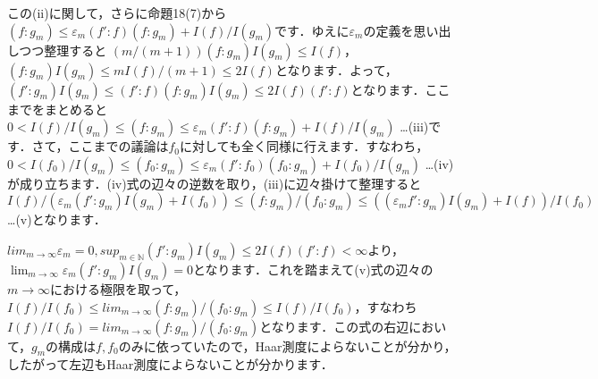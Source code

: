 この(ii)に関して，さらに命題18(7)から$\left( f \colon g_{m} \right) \le \varepsilon_{m} \left( f' \colon f \right) \left( f \colon g_{m} \right) + I(f)/I(g_{m})$です．ゆえに$\varepsilon_{m}$の定義を思い出しつつ整理すると $\left( m/(m+1) \right) \left( f \colon g_{m} \right)I(g_{m}) \le I(f)$，$\left( f \colon g_{m} \right)I(g_{m}) \le mI(f)/(m+1) \le 2I(f)$となります．よって，$\left( f' \colon g_{m} \right)I(g_{m}) \le 
\left( f' \colon f \right) \left( f \colon g_{m} \right) I(g_{m}) \le 2I(f)\left( f' \colon f \right)$となります．ここまでをまとめると$0<I(f)/I(g_{m}) \le \left( f \colon g_{m} \right) \le \varepsilon_{m} \left( f' \colon f \right) \left( f \colon g_{m} \right) + I(f)/I(g_{m})$ …(iii)です．さて，ここまでの議論は$f_0$に対しても全く同様に行えます．すなわち，$0<I(f_0)/I(g_{m}) \le \left( f_0 \colon g_{m} \right) \le \varepsilon_{m} \left( f' \colon f_0 \right) \left( f_0 \colon g_{m} \right) + I(f_0)/I(g_{m})$ …(iv)が成り立ちます．(iv)式の辺々の逆数を取り，(iii)に辺々掛けて整理すると$I(f)/ \left( \varepsilon_{m} \left( f' \colon g_{m} \right)I(g_{m}) + I(f_0) \right) \le \left( f \colon g_{m} \right) / \left( f_0 \colon g_{m} \right) \le \left( \left( \varepsilon_{m} f' \colon g_{m} \right)I(g_{m}) + I(f) \right) / I(f_0)$…(v)となります．

$lim_{m \to \infty}\varepsilon_{m} =0, sup_{m \in \mathbb{N}}\left( f' \colon g_{m} \right)I(g_{m}) \le 2I(f)\left( f' \colon f \right) < \infty$より，$\lim_{m \to \infty}\varepsilon_{m} \left( f' \colon g_{m} \right)I(g_{m})=0$となります．これを踏まえて(v)式の辺々の$m \to \infty$における極限を取って，$I(f)/I(f_{0}) \le lim_{m \to \infty} \left( f \colon g_{m} \right) / \left( f_{0} \colon g_{m} \right) \le I(f)/I(f_{0})$，すなわち $I(f)/I(f_{0})=lim_{m \to \infty} \left( f \colon g_{m} \right) / \left( f_{0} \colon g_{m} \right)$となります．この式の右辺において，$g_{m}$の構成は$f, f_{0}$のみに依っていたので，Haar測度によらないことが分かり，したがって左辺もHaar測度によらないことが分かります．　
\proofend
